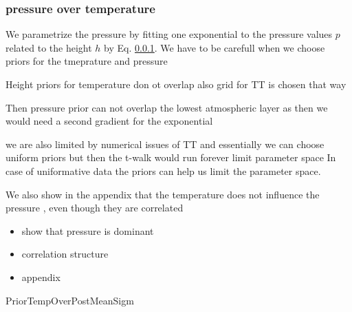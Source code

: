 \subsubsection{pressure over temperature}
We parametrize the pressure by fitting one exponential to the pressure values $p$ related to the height $h$ by Eq. \ref{}.
We have to be carefull when we choose priors for the tmeprature and pressure

Height priors for temperature don ot overlap also grid for TT is chosen that way

Then pressure prior can not overlap the lowest atmospheric layer as then we would need a second gradient for the exponential

we are also limited by numerical issues of TT
and essentially we can choose uniform priors but then the t-walk would run forever limit parameter space
In case of uniformative data the priors can help us limit the parameter space.

We also show in the appendix that the temperature does not influence the pressure , even though they are correlated
\begin{itemize}
	\item show that pressure is dominant
	\item correlation structure
	\item appendix
\end{itemize}

PriorTempOverPostMeanSigm



